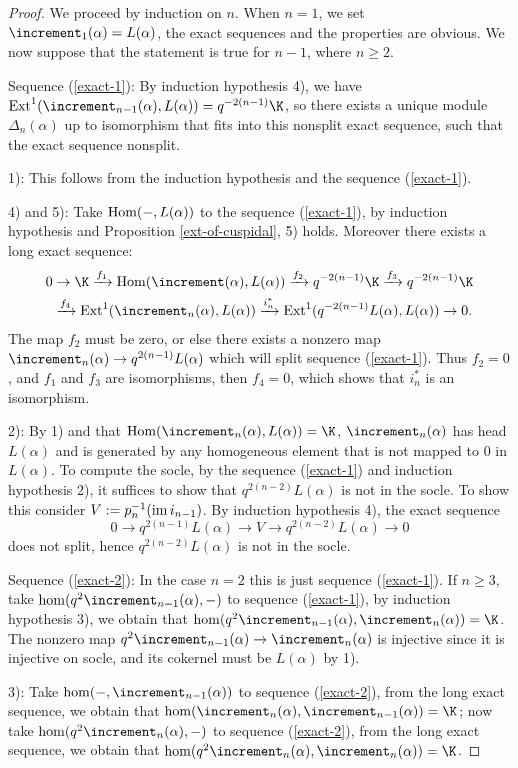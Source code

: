\begin{proof}
    We proceed by induction on $n$. When $n = 1$, we set $\std_1(\alpha)
     = L(\alpha)$, the exact sequences and the properties are obvious.
    We now suppose that the statement is true for $n-1$, where
    $n\ge 2$.

    Sequence (\ref{exact-1}): By induction hypothesis 4),
    we have $\Ext^1(\std_{n-1}(\alpha),L(\alpha)) = q^{-2(n-1)}\K$,
    so there exists a unique module $\Delta_n(\alpha)$ up to isomorphism
    that fits into this nonsplit exact sequence, such that 
    the exact sequence nonsplit.

    1): This follows from the induction hypothesis and the 
    sequence (\ref{exact-1}).

    4) and 5): Take $\operatorname{Hom}(-,L(\alpha))$ to the sequence (\ref{exact-1}),
    by induction hypothesis and Proposition \ref{ext-of-cuspidal},
    5) holds. Moreover there exists a long exact sequence:
    \[
        \begin{aligned}
            0&\to\K\xrightarrow{f_1}\Hom(\std(\alpha),L(\alpha))\xrightarrow{f_2}
            q^{-2(n-1)}\K\xrightarrow{f_3}q^{-2(n-1)}\K\\
            &\xrightarrow{f_4}
            \Ext^1(\std_n(\alpha),L(\alpha))\xrightarrow{i_n^*}
            \Ext^1(q^{-2(n-1)}L(\alpha),L(\alpha))\to 0.
        \end{aligned}
    \]
    The map $f_2$ must be zero, or else there exists a nonzero map
    $\std_n(\alpha)\to q^{2(n-1)}L(\alpha)$ which will split
    sequence (\ref{exact-1}). Thus $f_2 = 0$, and  $f_1$ and $f_3$ are isomorphisms,
    then $f_4 = 0$, which shows that $i_n^*$ is an isomorphism.

    2): By 1) and that $\Hom(\std_n(\alpha),L(\alpha)) = \K$,
    $\std_n(\alpha)$ has head $L(\alpha)$ and is generated by 
    any homogeneous element that is not mapped to $0$ in $L(\alpha)$.
    To compute the socle, by the sequence (\ref{exact-1})
    and induction hypothesis 2), it suffices to show that
    $q^{2(n-2)}L(\alpha)$ is not in the socle. To show this
    consider $V := p_n^{-1}(\operatorname{im} i_{n-1})$. By induction hypothesis 4),
    the exact sequence $$0\to q^{2(n-1)}L(\alpha)\to V
    \to q^{2(n-2)}L(\alpha)\to 0$$ does not split,
    hence $q^{2(n-2)}L(\alpha)$ is not in the socle.

    Sequence (\ref{exact-2}): In the case $n = 2$ this is just
    sequence (\ref{exact-1}). If $n\ge 3$, take $\hom(q^2\std_{n-1}(\alpha),-)$
    to sequence (\ref{exact-1}), by induction hypothesis 3),
    we obtain that $\hom(q^2\std_{n-1}(\alpha),\std_n(\alpha)) = \K$.
    The nonzero map $q^2\std_{n-1}(\alpha)\to\std_n(\alpha)$ is injective
    since it is injective on socle, and its cokernel must be
    $L(\alpha)$ by 1).

    3): Take $\hom(-,\std_{n-1}(\alpha))$ to sequence (\ref{exact-2}),
    from the long exact sequence, we obtain that $\hom(\std_n(\alpha),\std_{n-1}(\alpha)) = \K$;
    now take $\hom(q^2\std_n(\alpha),-)$ to sequence (\ref{exact-2}),
    from the long exact sequence, we obtain that $\hom(q^2\std_n(\alpha),\std_n(\alpha)) = \K$.
\end{proof}


